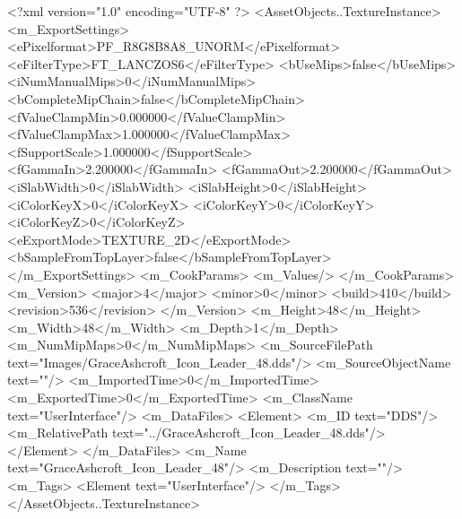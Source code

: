 <?xml version="1.0" encoding="UTF-8" ?>
<AssetObjects..TextureInstance>
	<m_ExportSettings>
		<ePixelformat>PF_R8G8B8A8_UNORM</ePixelformat>
		<eFilterType>FT_LANCZOS6</eFilterType>
		<bUseMips>false</bUseMips>
		<iNumManualMips>0</iNumManualMips>
		<bCompleteMipChain>false</bCompleteMipChain>
		<fValueClampMin>0.000000</fValueClampMin>
		<fValueClampMax>1.000000</fValueClampMax>
		<fSupportScale>1.000000</fSupportScale>
		<fGammaIn>2.200000</fGammaIn>
		<fGammaOut>2.200000</fGammaOut>
		<iSlabWidth>0</iSlabWidth>
		<iSlabHeight>0</iSlabHeight>
		<iColorKeyX>0</iColorKeyX>
		<iColorKeyY>0</iColorKeyY>
		<iColorKeyZ>0</iColorKeyZ>
		<eExportMode>TEXTURE_2D</eExportMode>
		<bSampleFromTopLayer>false</bSampleFromTopLayer>
	</m_ExportSettings>
	<m_CookParams>
		<m_Values/>
	</m_CookParams>
	<m_Version>
		<major>4</major>
		<minor>0</minor>
		<build>410</build>
		<revision>536</revision>
	</m_Version>
	<m_Height>48</m_Height>
	<m_Width>48</m_Width>
	<m_Depth>1</m_Depth>
	<m_NumMipMaps>0</m_NumMipMaps>
	<m_SourceFilePath text="Images/GraceAshcroft_Icon_Leader_48.dds"/>
	<m_SourceObjectName text=""/>
	<m_ImportedTime>0</m_ImportedTime>
	<m_ExportedTime>0</m_ExportedTime>
	<m_ClassName text="UserInterface"/>
	<m_DataFiles>
		<Element>
			<m_ID text="DDS"/>
			<m_RelativePath text="../GraceAshcroft_Icon_Leader_48.dds"/>
		</Element>
	</m_DataFiles>
	<m_Name text="GraceAshcroft_Icon_Leader_48"/>
	<m_Description text=""/>
	<m_Tags>
		<Element text="UserInterface"/>
	</m_Tags>
</AssetObjects..TextureInstance>
